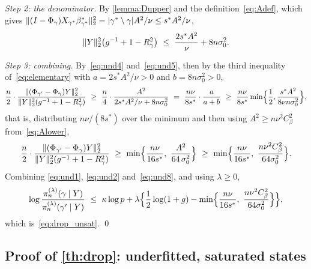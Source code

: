 \emph{Step 2: the denominator.} By \cref{lemma:Dupper} and the
definition~\eqref{eq:Adef}, which gives
$\lVert(I-\Phi_\gamma)X_{\gamma^{\ast}}\beta^{\ast}_{\gamma^{\ast}}\rVert_2^{2}
=\lvert\gamma^{\ast}\setminus\gamma\rvert A^{2}/\nu\leq s^{\ast}A^{2}/\nu$,
\begin{equation}
    \label{eq:und5}
    \lVert Y\rVert_2^{2}\bigl(g^{-1}+1-R^{2}_{\gamma}\bigr)
    \ \leq\ \frac{2s^{\ast}A^{2}}{\nu}+8n\sigma_0^{2} .
\end{equation}

\emph{Step 3: combining.} By~\eqref{eq:und4} and~\eqref{eq:und5}, then by
the third inequality of~\eqref{eq:elementary} with
$a=2s^{\ast}A^{2}/\nu>0$ and $b=8n\sigma_0^{2}>0$,
\begin{equation}
    \label{eq:und6}
    \frac n2\cdot
    \frac{\lVert(\Phi_{\gamma'}-\Phi_\gamma)Y\rVert_2^{2}}
    {\lVert Y\rVert_2^{2}(g^{-1}+1-R^{2}_{\gamma})}
    \ \geq\ \frac n4\cdot\frac{A^{2}}
    {2s^{\ast}A^{2}/\nu+8n\sigma_0^{2}}
    \ =\ \frac{n\nu}{8s^{\ast}}\cdot\frac{a}{a+b}
    \ \geq\ \frac{n\nu}{8s^{\ast}}
    \min\Bigl\{\frac12,\frac{s^{\ast}A^{2}}
    {8\nu n\sigma_0^{2}}\Bigr\} ,
\end{equation}
that is, distributing $n\nu/(8s^{\ast})$ over the minimum and then
using $A^{2}\geq n\nu^{2}C_\beta^{2}$ from~\eqref{eq:Alower},
\begin{equation}
    \label{eq:und8}
    \frac n2\cdot
    \frac{\lVert(\Phi_{\gamma'}-\Phi_\gamma)Y\rVert_2^{2}}
    {\lVert Y\rVert_2^{2}(g^{-1}+1-R^{2}_{\gamma})}
    \ \geq\ \min\Bigl\{\frac{n\nu}{16s^{\ast}},\
    \frac{A^{2}}{64\,\sigma_0^{2}}\Bigr\}
    \ \geq\ \min\Bigl\{\frac{n\nu}{16s^{\ast}},\ \frac{n\nu^{2}C_\beta^{2}}{64\sigma_0^{2}}\Bigr\} .
\end{equation}
Combining \eqref{eq:und1}, \eqref{eq:und2} and~\eqref{eq:und8}, and using
$\lambda\geq0$,
\begin{equation*}
    \log\frac{\pi_n^{(\lambda)}(\gamma\mid Y)}
    {\pi_n^{(\lambda)}(\gamma'\mid Y)}
    \ \leq\ \kappa\log p
    +\lambda\Bigl\{\frac12\log(1+g)-\min\Bigl\{\frac{n\nu}{16s^{\ast}},\ \frac{n\nu^{2}C_\beta^{2}}{64\sigma_0^{2}}\Bigr\}\Bigr\} ,
\end{equation*}
which is~\eqref{eq:drop_unsat}. \qed

\subsection{Proof of \cref{th:drop}: underfitted, saturated states}
\label{sub:sat}

